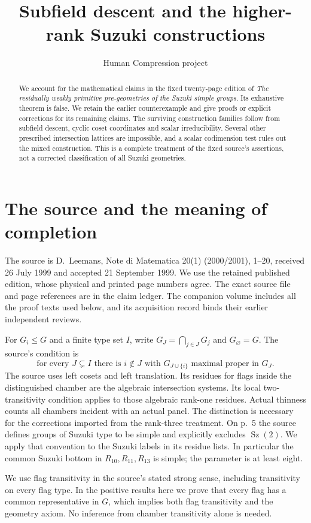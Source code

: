 \documentclass[11pt,a4paper]{article}
\title{Subfield descent and the higher-rank Suzuki constructions}
\author{Human Compression project}\date{}
\newcommand{\Sz}{\operatorname{Sz}}
\begin{document}
\maketitle
\begin{abstract}
We account for the mathematical claims in the fixed twenty-page edition
of \emph{The residually weakly primitive pre-geometries of the Suzuki
simple groups}. Its exhaustive theorem is false. We retain the earlier
counterexample and give proofs or explicit corrections for its remaining
claims. The surviving construction families follow from subfield descent,
cyclic coset coordinates and scalar irreducibility. Several other prescribed
intersection lattices are impossible, and a scalar codimension test rules
out the mixed construction. This is a complete treatment of the fixed
source's assertions, not a corrected classification of all Suzuki geometries.
\end{abstract}

\section{The source and the meaning of completion}
The source is D.~Leemans, Note di Matematica 20(1) (2000/2001),
1--20, received 26 July 1999 and accepted 21 September 1999.
We use the retained published edition, whose physical and printed page
numbers agree. The exact source file and page references are in the
claim ledger. The companion volume includes all the proof texts used
below, and its acquisition record binds their earlier independent reviews.

For $G_i\le G$ and a finite type set $I$, write
$G_J=\bigcap_{j\in J}G_j$ and $G_\varnothing=G$.
The source's condition is
\[
 \text{for every }J\subsetneq I\text{ there is }i\notin J
 \text{ with }G_{J\cup\{i\}}\text{ maximal proper in }G_J.
 \tag{1}
\]
The source uses left cosets and left translation. Its residues for flags
inside the distinguished chamber are the algebraic intersection systems.
Its local two-transitivity condition applies to those algebraic rank-one
residues. Actual thinness counts all chambers incident with an actual panel.
The distinction is necessary for the corrections imported from the
rank-three treatment.
On p.~5 the source defines groups of Suzuki type to be simple and
explicitly excludes $\Sz(2)$. We apply that convention to the Suzuki
labels in its residue lists. In particular the common Suzuki bottom in
$R_{10},R_{11},R_{13}$ is simple; the parameter is at least eight.


We use flag transitivity in the source's stated strong sense, including
transitivity on every flag type. In the positive results here we prove
that every flag has a common representative in $G$, which implies both
flag transitivity and the geometry axiom. No inference from chamber
transitivity alone is needed.
\end{document}
